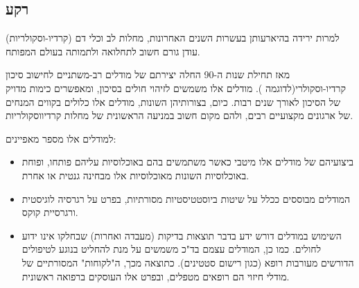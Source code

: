 \documentclass[a4paper,12pt]{article}
\begin{document}
	\begin{hebrew}
		\subsection*{רקע}
			למרות ירידה בהיארעותן בעשרות השנים האחרונות\cite{Koton2014,Vangen-Loenne2017}, מחלות לב וכלי דם (קרדיו-וסקולריות) עודן גורם חשוב לתחלואה ולתמותה בעולם המפותח\cite{ODonnell2016}.
			
			מאז תחילת שנות ה-90 החלה יצירתם של מודלים רב-משתניים לחישוב סיכון קרדיו-וסקולרי(לדוגמה \cite{Wilson1998,Conroy2003,DAgostino2008}). מודלים אלו משמשים לזיהוי חולים בסיכון, ומאפשרים כימות מדויק של הסיכון לאורך שנים רבות\cite{Goff2014}. כיום, בצורותיהן השונות, מודלים אלו כלולים בקווים המנחים של ארגונים מקצועיים רבים, ולהם מקום חשוב במניעה הראשונית של מחלות קרדיווסקולריות\cite{Graham2007,Goff2014}.
			
			למודלים אלו מספר מאפיינים:
			\begin{itemize}
				\item ביצועיהם של מודלים אלו מיטבי כאשר משתמשים בהם באוכלוסיות עליהם פותחו, ופוחת באוכלוסיות השונות מאוכלוסיות אלו מבחינה גנטית או אחרת\cite{DAgostino2001,Bastuji-Garin2002,DeFilippis2015}.
				
				\item המודלים מבוססים ככלל על שיטות ביוסטטיסטיות מסורתיות, בפרט על רגרסיה לוגיסטית ורגרסיית קוקס.
				
				\item השימוש במודלים דורש ידע בדבר תוצאות בדיקות (מעבדה ואחרות) שבחלקו אינו ידוע לחולים. כמו כן, המודלים עצמם בד"כ משמשים על מנת להחליט בנוגע לטיפולים הדורשים מעורבות רופא (כגון רישום סטטינים). כתוצאה מכך, ה"לקוחות" המסורתיים של מודלי חיזוי הם רופאים מטפלים, ובפרט אלו העוסקים ברפואה ראשונית.
			\end{itemize}
				

\end{hebrew}
\end{document}
